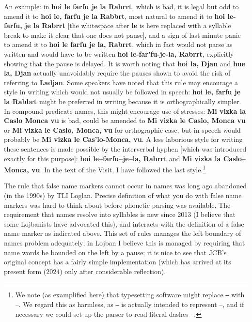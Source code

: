 \documentclass[12pt]{book}
\begin{document}
An example:  in {\bf hoi le farfu je la Rabrrt}, which is bad, it is legal but odd to amend it to {\bf hoi le, farfu je la Rabbrt}, most natural to amend it to {\bf hoi le-farfu, je la Rabrrt} [the whitespace after {\bf le} is here replaced with a syllable break to make it clear that one does not pause], and a sign of last minute panic to amend it to {\bf hoi le farfu je la, Rabrrt}, which in fact would not parse as written and would have to be written
{\bf hoi le-far'fu-je-la, Rabrrt}, explicitly showing that the pause is delayed.  It is worth noting that {\bf hoi la, Djan} and {\bf hue la, Djan} actually unavoidably require the pauses shown to avoid the risk of referring to {\bf Ladjan}.   Some speakers have noted that this rule may encourage a style in writing which would not usually be followed in speech:  {\bf hoi le, farfu je la Rabbrt} might be preferred in writing because it is orthographically simpler.  In compound predicate names, this might encourage use of stresses:  {\bf Mi vizka la Caslo Monca vu} is bad, could be amended to {\bf Mi vizka le Caslo, Monca vu} or {\bf Mi vizka le Caslo, Monca, vu} for orthographic ease, but in speech would probably be {\bf Mi vizka le Cas'lo-Monca, vu}.    A less laborious style for writing these sentences is made possible by the interverbal hyphen [which was introduced exactly for this purpose]:  {\bf hoi le--farfu--je--la, Rabrrt} and {\bf Mi vizka la Caslo--Monca, vu}.  In the text of the Visit, I have followed the last style.\footnote{We note (as examplified here) that typesetting software might replace {\tt --} with --.  We regard this as harmless, as {\tt --} is actually intended to represent --, and if necessary we could set up the parser to read literal dashes --.}

The rule that false name markers cannot occur in names was long ago abandoned (in the 1990s) by TLI Loglan.  Precise definition of what you do with false name markers was hard to think about before phonetic parsing was available.  The requirement that names resolve into syllables is new since 2013 (I believe that some Lojbanists have advocated this), and interacts with the definition of a false name marker as indicated above.    This set of rules manages the left boundary of names problem adequately;  in Lojban I believe this is managed by requiring that name words be bounded on the left by a pause;  it is nice to see that JCB's original concept
has a fairly simple implementation (which has arrived at its present form (2024) only after considerable reflection).
\end{document}
